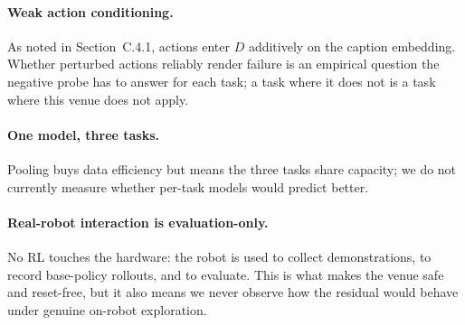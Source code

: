 \documentclass[letterpaper]{article} %
\begin{document}
\paragraph{Weak action conditioning.}
As noted in Section~C.4.1, actions enter $D$ additively on the caption embedding.
Whether perturbed actions reliably render failure is an empirical question the
negative probe has to answer for each task; a task where it does not is a task
where this venue does not apply.

\paragraph{One model, three tasks.}
Pooling buys data efficiency but means the three tasks share capacity; we do not
currently measure whether per-task models would predict better.

\paragraph{Real-robot interaction is evaluation-only.}
No RL touches the hardware: the robot is used to collect demonstrations, to
record base-policy rollouts, and to evaluate. This is what makes the venue safe
and reset-free, but it also means we never observe how the residual would behave
under genuine on-robot exploration.



\end{document}
